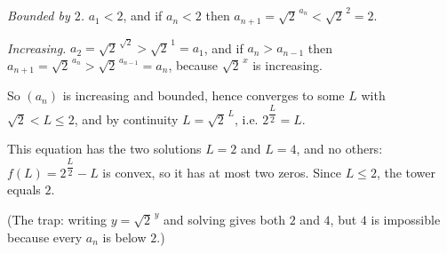 \emph{Bounded by $2$.} $a_1<2$, and if $a_n<2$ then $a_{n+1}=\sqrt2^{\,a_n}<\sqrt2^{\,2}=2$.

\emph{Increasing.} $a_2=\sqrt2^{\,\sqrt2}>\sqrt2^{\,1}=a_1$, and if $a_n>a_{n-1}$ then $a_{n+1}=\sqrt2^{\,a_n}>\sqrt2^{\,a_{n-1}}=a_n$, because $\sqrt2^{\,x}$ is increasing.

So $(a_n)$ is increasing and bounded, hence converges to some $L$ with $\sqrt2<L\le2$, and by continuity $L=\sqrt2^{\,L}$, i.e. $2^{\dfrac L2}=L$.

This equation has the two solutions $L=2$ and $L=4$, and no others: $f(L)=2^{\dfrac L2}-L$ is convex, so it has at most two zeros. Since $L\le2$, the tower equals $\boxed{2}$.

(The trap: writing $y=\sqrt2^{\,y}$ and solving gives both $2$ and $4$, but $4$ is impossible because every $a_n$ is below $2$.)
